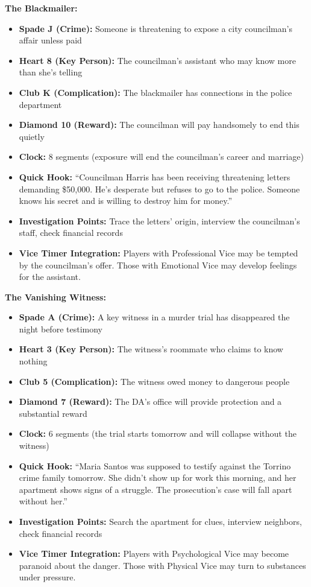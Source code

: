 \documentclass[11pt]{article}
\begin{document}
\textbf{The Blackmailer:}
\begin{itemize}
    \item \textbf{Spade J (Crime):} Someone is threatening to expose a city councilman's affair unless paid
    \item \textbf{Heart 8 (Key Person):} The councilman's assistant who may know more than she's telling
    \item \textbf{Club K (Complication):} The blackmailer has connections in the police department
    \item \textbf{Diamond 10 (Reward):} The councilman will pay handsomely to end this quietly
    \item \textbf{Clock:} 8 segments (exposure will end the councilman's career and marriage)
    \item \textbf{Quick Hook:} ``Councilman Harris has been receiving threatening letters demanding \$50,000. He's desperate but refuses to go to the police. Someone knows his secret and is willing to destroy him for money.''
    \item \textbf{Investigation Points:} Trace the letters' origin, interview the councilman's staff, check financial records
    \item \textbf{Vice Timer Integration:} Players with Professional Vice may be tempted by the councilman's offer. Those with Emotional Vice may develop feelings for the assistant.
\end{itemize}

\textbf{The Vanishing Witness:}
\begin{itemize}
    \item \textbf{Spade A (Crime):} A key witness in a murder trial has disappeared the night before testimony
    \item \textbf{Heart 3 (Key Person):} The witness's roommate who claims to know nothing
    \item \textbf{Club 5 (Complication):} The witness owed money to dangerous people
    \item \textbf{Diamond 7 (Reward):} The DA's office will provide protection and a substantial reward
    \item \textbf{Clock:} 6 segments (the trial starts tomorrow and will collapse without the witness)
    \item \textbf{Quick Hook:} ``Maria Santos was supposed to testify against the Torrino crime family tomorrow. She didn't show up for work this morning, and her apartment shows signs of a struggle. The prosecution's case will fall apart without her.''
    \item \textbf{Investigation Points:} Search the apartment for clues, interview neighbors, check financial records
    \item \textbf{Vice Timer Integration:} Players with Psychological Vice may become paranoid about the danger. Those with Physical Vice may turn to substances under pressure.
\end{itemize}
\end{document}
